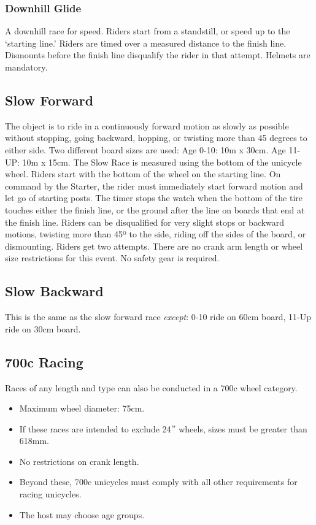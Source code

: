 \subsubsection{Downhill Glide}
A downhill race for speed.
Riders start from a standstill, or speed up to the ‘starting line.' Riders are timed over a measured distance to the finish line.
Dismounts before the finish line disqualify the rider in that attempt.
Helmets are mandatory.

\subsection{Slow Forward}
The object is to ride in a continuously forward motion as slowly as possible without stopping, going backward, hopping, or twisting more than 45 degrees to either side.
Two different board sizes are used: Age 0-10: 10m x 30cm.
Age 11-UP: 10m x 15cm.
The Slow Race is measured using the bottom of the unicycle wheel.
Riders start with the bottom of the wheel on the starting line.
On command by the Starter, the rider must immediately start forward motion and let go of starting posts.
The timer stops the watch when the bottom of the tire touches either the finish line, or the ground after the line on boards that end at the finish line.
Riders can be disqualified for very slight stops or backward motions, twisting more than 45º to the side, riding off the sides of the board, or dismounting.
Riders get two attempts.
There are no crank arm length or wheel size restrictions for this event.
No safety gear is required.

\subsection{Slow Backward}
This is the same as the slow forward race \textit{except}: 0-10 ride on 60cm board, 11-Up ride on 30cm board.

\subsection{700c Racing}
Races of any length and type can also be conducted in a 700c wheel category.
\begin{itemize}
\item Maximum wheel diameter: 75cm.
\item If these races are intended to exclude 24$"$ wheels, sizes must be greater than 618mm.
\item No restrictions on crank length.
\item Beyond these, 700c unicycles must comply with all other requirements for racing unicycles.
\item The host may choose age groups.
\end{itemize}

